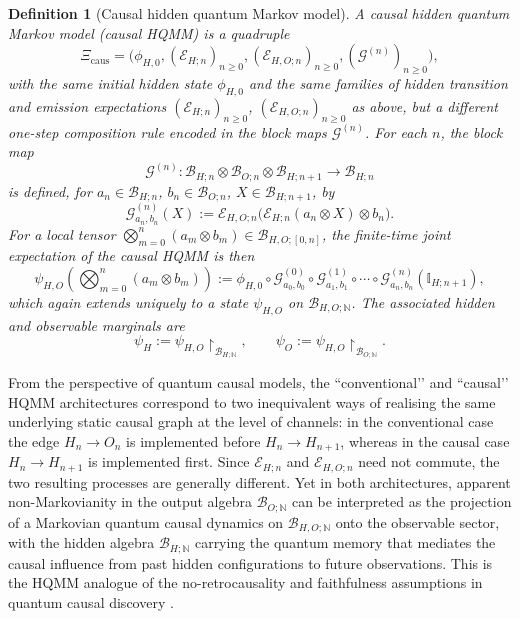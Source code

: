 \documentclass[11pt, reco]{article}
\newtheorem{definition}[theorem]{Definition}
\begin{document}
\begin{definition}[Causal hidden quantum Markov model]
A \emph{causal hidden quantum Markov model} (causal HQMM) is a quadruple
\[
\Xi_{\mathrm{caus}}
=
\bigl(\phi_{H,0},(\mathcal{E}_{H;n})_{n\ge 0},(\mathcal{E}_{H,O;n})_{n\ge 0},(\mathcal{G}^{(n)})_{n\ge 0}\bigr),
\]
with the same initial hidden state \(\phi_{H,0}\) and the same families of hidden transition and emission expectations \((\mathcal{E}_{H;n})_{n\ge 0}\), \((\mathcal{E}_{H,O;n})_{n\ge 0}\) as above, but a different one-step composition rule encoded in the block maps \(\mathcal{G}^{(n)}\). For each \(n\), the block map
\[
\mathcal{G}^{(n)}:\mathcal{B}_{H;n}\otimes\mathcal{B}_{O;n}\otimes\mathcal{B}_{H;n+1}\to\mathcal{B}_{H;n}
\]
is defined, for \(a_n\in\mathcal{B}_{H;n}\), \(b_n\in\mathcal{B}_{O;n}\), \(X\in\mathcal{B}_{H;n+1}\), by
\[
\mathcal{G}^{(n)}_{a_n,b_n}(X)
:=
\mathcal{E}_{H,O;n}\bigl(\mathcal{E}_{H;n}(a_n\otimes X)\otimes b_n\bigr).
\]
For a local tensor \(\bigotimes_{m=0}^n (a_m\otimes b_m)\in\mathcal{B}_{H,O;[0,n]}\), the finite-time joint expectation of the causal HQMM is then
\begin{equation}\label{eq:caus-state-no-sup}
\psi_{H,O}\!\left(\bigotimes_{m=0}^n (a_m\otimes b_m)\right)
:=
\phi_{H,0}\circ
\mathcal{G}^{(0)}_{a_0,b_0}\circ\mathcal{G}^{(1)}_{a_1,b_1}\circ\cdots\circ
\mathcal{G}^{(n)}_{a_n,b_n}(\mathbb{I}_{H;n+1}),
\end{equation}
which again extends uniquely to a state \(\psi_{H,O}\) on \(\mathcal{B}_{H,O;\mathbb{N}}\). The associated hidden and observable marginals are
\[
\psi_H
:=
\psi_{H,O}\!\restriction_{\mathcal{B}_{H;\mathbb{N}}},\qquad
\psi_O
:=
\psi_{H,O}\!\restriction_{\mathcal{B}_{O;\mathbb{N}}}.
\]
\end{definition}

From the perspective of quantum causal models, the “conventional’’ and “causal’’ HQMM architectures correspond to two inequivalent ways of realising the same underlying static causal graph at the level of channels: in the conventional case the edge \(H_n\to O_n\) is implemented before \(H_n\to H_{n+1}\), whereas in the causal case \(H_n\to H_{n+1}\) is implemented first. Since \(\mathcal{E}_{H;n}\) and \(\mathcal{E}_{H,O;n}\) need not commute, the two resulting processes are generally different. Yet in both architectures, apparent non-Markovianity in the output algebra \(\mathcal{B}_{O;\mathbb{N}}\) can be interpreted as the projection of a Markovian quantum causal dynamics on \(\mathcal{B}_{H,O;\mathbb{N}}\) onto the observable sector, with the hidden algebra \(\mathcal{B}_{H;\mathbb{N}}\) carrying the quantum memory that mediates the causal influence from past hidden configurations to future observations.  This is the HQMM analogue of the no-retrocausality and faithfulness assumptions in quantum causal discovery \cite{GiarmatziCosta18}.
\end{document}
